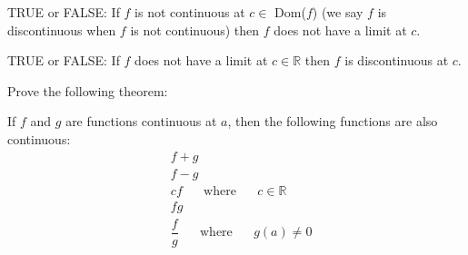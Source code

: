 \begin{exercise}
TRUE or FALSE: If $f$ is not continuous at $c \in$ Dom($f$) (we say $f$ is discontinuous when $f$ is not continuous) then $f$ does not have a limit at $c$.
\end{exercise}

\begin{exercise}
TRUE or FALSE: If $f$ does not have a limit at $c \in \mathbb{R}$  then $f$ is discontinuous at $c$.
\end{exercise}

\begin{exercise}
Prove the following theorem:
\begin{theorem}
If $f$ and $g$ are functions continuous at $a$, then the following functions are also continuous:
\begin{align*}
    &f + g\\[2ex]
    &f - g\\[2ex]
    &cf \hspace{20pt} \text{where} \hspace{20pt} c \in \mathbb{R}\\[2ex]
    &fg\\[2ex]
    &\dfrac{f}{g} \hspace{20pt} \text{where} \hspace{20pt} g(a) \neq 0
\end{align*}
\end{theorem}
\end{exercise}

